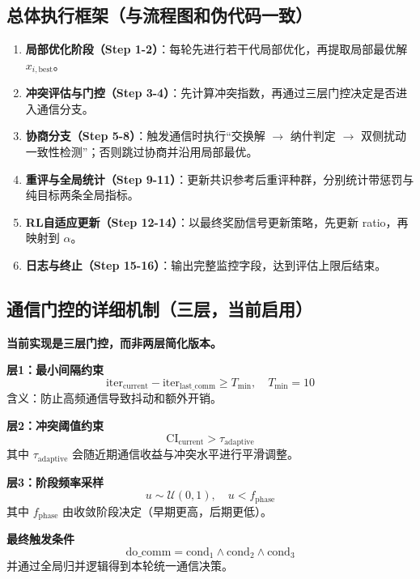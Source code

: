 \documentclass[11pt,a3paper]{ctexart}
\begin{document}
\subsection{总体执行框架（与流程图和伪代码一致）}
\begin{enumerate}
    \item \textbf{局部优化阶段（Step 1-2）}：每轮先进行若干代局部优化，再提取局部最优解 $x_{i,\text{best}}$。
    \item \textbf{冲突评估与门控（Step 3-4）}：先计算冲突指数，再通过三层门控决定是否进入通信分支。
    \item \textbf{协商分支（Step 5-8）}：触发通信时执行“交换解 $\rightarrow$ 纳什判定 $\rightarrow$ 双侧扰动一致性检测”；否则跳过协商并沿用局部最优。
    \item \textbf{重评与全局统计（Step 9-11）}：更新共识参考后重评种群，分别统计带惩罚与纯目标两条全局指标。
    \item \textbf{RL自适应更新（Step 12-14）}：以最终奖励信号更新策略，先更新 ratio，再映射到 $\alpha$。
    \item \textbf{日志与终止（Step 15-16）}：输出完整监控字段，达到评估上限后结束。
\end{enumerate}

\subsection{通信门控的详细机制（三层，当前启用）}
\textbf{当前实现是三层门控，而非两层简化版本。}

\textbf{层1：最小间隔约束}
\begin{equation}
\text{iter}_{\text{current}} - \text{iter}_{\text{last\_comm}} \ge T_{\min}, \quad T_{\min}=10
\end{equation}
含义：防止高频通信导致抖动和额外开销。

\textbf{层2：冲突阈值约束}
\begin{equation}
\text{CI}_{\text{current}} > \tau_{\text{adaptive}}
\end{equation}
其中 $\tau_{\text{adaptive}}$ 会随近期通信收益与冲突水平进行平滑调整。

\textbf{层3：阶段频率采样}
\begin{equation}
u \sim \mathcal{U}(0,1), \quad u < f_{\text{phase}}
\end{equation}
其中 $f_{\text{phase}}$ 由收敛阶段决定（早期更高，后期更低）。

\textbf{最终触发条件}
\begin{equation}
\text{do\_comm} = \text{cond}_1 \land \text{cond}_2 \land \text{cond}_3
\end{equation}
并通过全局归并逻辑得到本轮统一通信决策。
\end{document}
